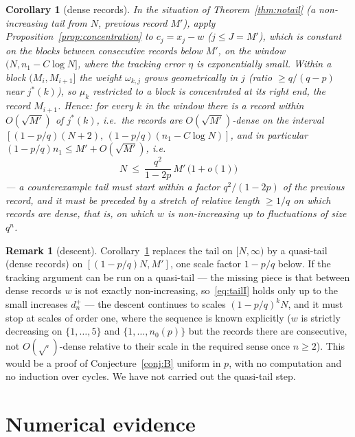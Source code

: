 \documentclass[11pt]{article}
\newtheorem{corollary}[theorem]{Corollary}
\theoremstyle{definition}
\newtheorem{remark}[theorem]{Remark}
\begin{document}
\begin{corollary}[dense records]\label{cor:dense}
  In the situation of Theorem~\ref{thm:notail} (a non-increasing tail
  from $N$, previous record $M'$), apply
  Proposition~\ref{prop:concentration} to $c_j=x_j-w$ ($j\le J=M'$),
  which is constant on the blocks between consecutive records below
  $M'$, on the window $(N,n_1-C\log N]$, where the tracking error
  $\eta$ is exponentially small.  Within a block $(M_i,M_{i+1}]$ the
  weight $\omega_{k,j}$ grows geometrically in $j$ (ratio
  $\ge q/(q-p)$ near $j^*(k)$), so $\mu_k$ restricted to a block is
  concentrated at its right end, the record $M_{i+1}$.  Hence:
  \emph{for every $k$ in the window there is a record within
  $O(\sqrt{M'})$ of $j^*(k)$}, i.e.\ the records are
  $O(\sqrt{M'})$-dense on the interval
  $[(1-p/q)(N+2),\,(1-p/q)(n_1-C\log N)]$, and in particular
  $(1-p/q)n_1\le M'+O(\sqrt{M'})$, i.e.
  \[
    N\ \le\ \frac{q^{2}}{1-2p}\,M'\,\bigl(1+o(1)\bigr)
  \]
  --- a counterexample tail must start within a factor $q^2/(1-2p)$
  of the previous record, and it must be preceded by a stretch of
  relative length $\ge1/q$ on which records are dense, that is, on
  which $w$ is non-increasing up to fluctuations of size $q^{n}$.
\end{corollary}

\begin{remark}[descent]
  Corollary~\ref{cor:dense} replaces the tail on $[N,\infty)$ by a
  quasi-tail (dense records) on $[(1-p/q)N,M']$, one scale factor
  $1-p/q$ below.  If the tracking argument can be run on a
  quasi-tail --- the missing piece is that between dense records $w$
  is not exactly non-increasing, so~\eqref{eq:tailI} holds only up to
  the small increases $d_n^+$ --- the descent continues to scales
  $(1-p/q)^kN$, and it must stop at scales of order one, where the
  sequence is known explicitly ($w$ is strictly decreasing on
  $\{1,\dots,5\}$ and $\{1,\dots,n_0(p)\}$ but the records there are
  consecutive, not $O(\sqrt{\cdot})$-dense relative to their scale in
  the required sense once $n\ge 2$).  This would be a proof of
  Conjecture~\ref{conj:B} uniform in $p$, with no computation and no
  induction over cycles.  We have not carried out the quasi-tail step.
\end{remark}

\section{Numerical evidence}\label{sec:numerics}
\end{document}
